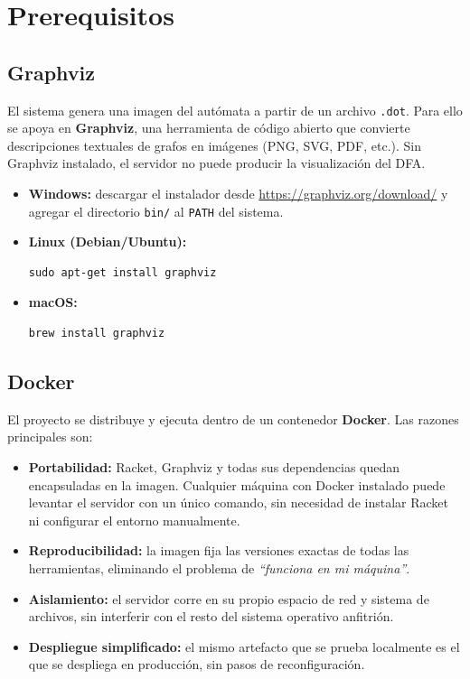 \documentclass{article}
\begin{document}
\section{Prerequisitos}

\subsection{Graphviz}

El sistema genera una imagen del autómata a partir de un archivo \texttt{.dot}.
Para ello se apoya en \textbf{Graphviz}, una herramienta de código abierto que
convierte descripciones textuales de grafos en imágenes (PNG, SVG, PDF, etc.).
Sin Graphviz instalado, el servidor no puede producir la visualización del DFA.

\begin{itemize}
  \item \textbf{Windows:} descargar el instalador desde \url{https://graphviz.org/download/}
        y agregar el directorio \texttt{bin/} al \texttt{PATH} del sistema.
  \item \textbf{Linux (Debian/Ubuntu):}
\begin{verbatim}
sudo apt-get install graphviz
\end{verbatim}
  \item \textbf{macOS:}
\begin{verbatim}
brew install graphviz
\end{verbatim}
\end{itemize}

\subsection{Docker}

El proyecto se distribuye y ejecuta dentro de un contenedor \textbf{Docker}.
Las razones principales son:

\begin{itemize}
  \item \textbf{Portabilidad:} Racket, Graphviz y todas sus dependencias quedan
        encapsuladas en la imagen. Cualquier máquina con Docker instalado puede
        levantar el servidor con un único comando, sin necesidad de instalar Racket
        ni configurar el entorno manualmente.
  \item \textbf{Reproducibilidad:} la imagen fija las versiones exactas de todas
        las herramientas, eliminando el problema de \textit{``funciona en mi máquina''}.
  \item \textbf{Aislamiento:} el servidor corre en su propio espacio de red y sistema
        de archivos, sin interferir con el resto del sistema operativo anfitrión.
  \item \textbf{Despliegue simplificado:} el mismo artefacto que se prueba localmente
        es el que se despliega en producción, sin pasos de reconfiguración.
\end{itemize}
\end{document}
